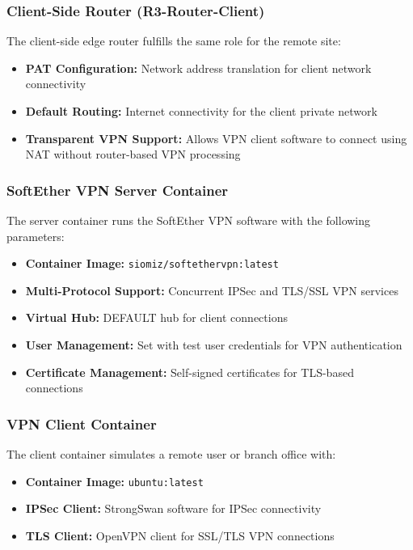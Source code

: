 \subsubsection{Client-Side Router (R3-Router-Client)}

The client-side edge router fulfills the same role for the remote site:

\begin{itemize}
    \item \textbf{PAT Configuration:} Network address translation for client network connectivity
    \item \textbf{Default Routing:} Internet connectivity for the client private network
    \item \textbf{Transparent VPN Support:} Allows VPN client software to connect using NAT without router-based VPN processing
\end{itemize}

\subsubsection{SoftEther VPN Server Container}

The server container runs the SoftEther VPN software with the following parameters:

\begin{itemize}
    \item \textbf{Container Image:} \texttt{siomiz/softethervpn:latest}
    \item \textbf{Multi-Protocol Support:} Concurrent IPSec and TLS/SSL VPN services
    \item \textbf{Virtual Hub:} DEFAULT hub for client connections
    \item \textbf{User Management:} Set with test user credentials for VPN authentication
    \item \textbf{Certificate Management:} Self-signed certificates for TLS-based connections
\end{itemize}

\subsubsection{VPN Client Container}

The client container simulates a remote user or branch office with:

\begin{itemize}
    \item \textbf{Container Image:} \texttt{ubuntu:latest}
    \item \textbf{IPSec Client:} StrongSwan software for IPSec connectivity
    \item \textbf{TLS Client:} OpenVPN client for SSL/TLS VPN connections
\end{itemize}

